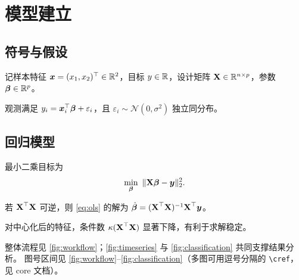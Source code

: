 \section{模型建立}

\subsection{符号与假设}

\begin{definition}[特征向量]\label{def:feature}
记样本特征 $\boldsymbol{x}=(x_1,x_2)^\top\in\mathbb{R}^2$，目标 $y\in\mathbb{R}$，设计矩阵
$\boldsymbol{\mathrm{X}}\in\mathbb{R}^{n\times p}$，参数 $\boldsymbol{\beta}\in\mathbb{R}^p$。
\end{definition}

\begin{assumption}[线性可加噪声]
观测满足 $y_i=\boldsymbol{x}_i^\top\boldsymbol{\beta}+\varepsilon_i$，且
$\varepsilon_i\sim\mathcal{N}(0,\sigma^2)$ 独立同分布。
\end{assumption}

\subsection{回归模型}

最小二乘目标为
\begin{equation}\label{eq:ols}
  \min_{\boldsymbol{\beta}}\ \|\boldsymbol{\mathrm{X}}\boldsymbol{\beta}-\boldsymbol{y}\|_2^2 .
\end{equation}

\begin{theorem}[正规方程]\label{thm:main}
若 $\boldsymbol{\mathrm{X}}^\top\boldsymbol{\mathrm{X}}$ 可逆，则 \eqref{eq:ols} 的解为
$\hat{\boldsymbol{\beta}}=(\boldsymbol{\mathrm{X}}^\top\boldsymbol{\mathrm{X}})^{-1}\boldsymbol{\mathrm{X}}^\top\boldsymbol{y}$。
\end{theorem}

\begin{lemma}[数值稳定性]\label{lem:stable}
对中心化后的特征，条件数 $\kappa(\boldsymbol{\mathrm{X}}^\top\boldsymbol{\mathrm{X}})$ 显著下降，有利于求解稳定。
\end{lemma}

整体流程见 \cref{fig:workflow}；\cref{fig:timeseries} 与 \cref{fig:classification} 共同支撑结果分析。
图号区间见 \ref{fig:workflow}--\ref{fig:classification}（多图可用逗号分隔的 \verb|\cref|，见 core 文档）。


